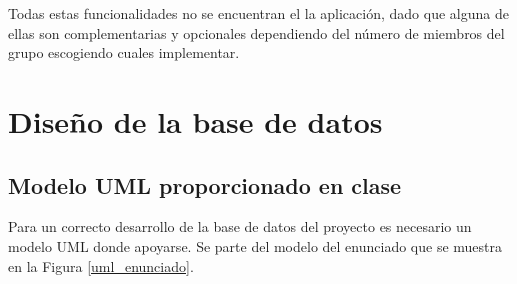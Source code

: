 \documentclass[pdftex,11pt,a4paper]{book}
\begin{document}
Todas estas funcionalidades no se encuentran el la aplicación, dado que alguna de ellas son complementarias y opcionales dependiendo del número de miembros del grupo escogiendo cuales implementar.



\chapter{Diseño de la base de datos}

\section{Modelo UML proporcionado en clase}

Para un correcto desarrollo de la base de datos del proyecto es necesario un modelo UML donde apoyarse. Se parte del modelo del enunciado que se muestra en la Figura \ref{uml_enunciado}.
\end{document}
